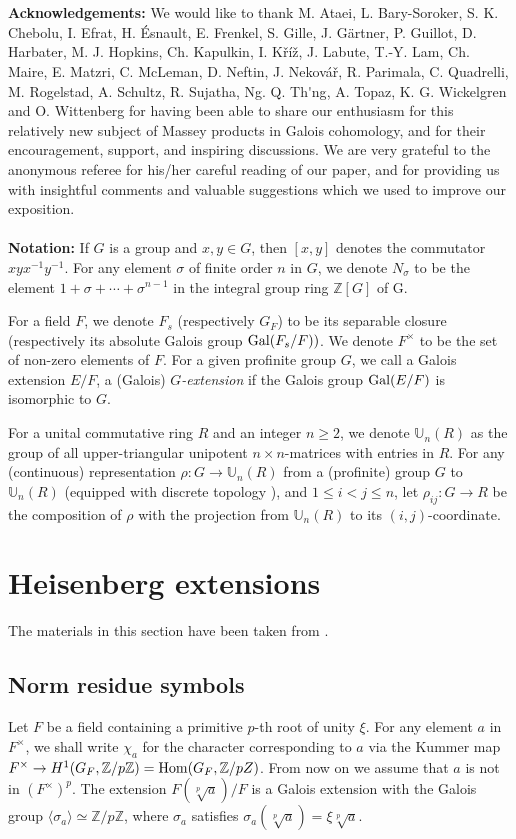 \documentclass[12pt,leqno]{amsart}
\theoremstyle{plain}
\theoremstyle{definition}
\newcommand{\U}{{\mathbb U}}
\newcommand{\Z}{{\mathbb Z}}
\begin{document}
\\
\\
{\bf Acknowledgements: } We would like to thank  M. Ataei, L. Bary-Soroker, S. K. Chebolu, I. Efrat, H. \'{E}snault, E. Frenkel, S. Gille, J. G\"{a}rtner, P. Guillot, D. Harbater, M. J. Hopkins, Ch. Kapulkin, I. K\v{r}\'i\v{z}, J. Labute, T.-Y. Lam, Ch. Maire, E. Matzri,   C. McLeman, D. Neftin, J. Nekov\'a\v{r}, R. Parimala, C. Quadrelli, M. Rogelstad, A. Schultz, R. Sujatha, Ng. Q. {\selectfont Th\'\abreve{}ng}, A. Topaz, K. G. Wickelgren and O. Wittenberg
for having been able to share our enthusiasm for this relatively new subject of Massey products in Galois cohomology, and for their encouragement, support, and  inspiring discussions.   We are  very grateful to the  anonymous referee for his/her  careful reading of our paper, and for providing us with insightful comments and valuable suggestions which we used to improve our exposition.
\\
\\
{\bf Notation:} If $G$ is a group and $x,y\in G$, then $[x,y]$ denotes the commutator $xy x^{-1}y^{-1}$. 
For any element $\sigma$ of  finite order $n$ in $G$, we denote $N_{\sigma}$ to be  the element $1 +\sigma +\cdots +\sigma^{n-1}$ in the integral group ring $\Z[G]$ of G.

For a field $F$, we denote $F_s$ (respectively $G_F$) to be its separable closure (respectively its absolute Galois group ${\rm Gal}(F_s/F))$. We denote $F^\times$ to be the set of non-zero elements of $F$.
 For a given profinite group $G$, we call a Galois extension $E/F$, a (Galois) {\it $G$-extension} if the Galois group ${\rm Gal}(E/F)$ is isomorphic to $G$.
 
For a unital commutative ring $R$ and  an integer $n\geq 2$, we denote $\U_n(R)$ as the group of all upper-triangular unipotent $n\times n$-matrices with entries in $R$.  
For any (continuous) representation $\rho\colon G \to \U_n(R)$ from a (profinite) group $G$ to $\U_n(R)$ (equipped with discrete topology ), and $1\leq i< j\leq n$, let $\rho_{ij}\colon G \to R$ be the composition of $\rho$  with the projection from $\U_n(R)$ to its $(i,j)$-coordinate.

\section{Heisenberg extensions}
\label{sec:Heisenberg}
The materials in this section have been taken from \cite[Section 3]{MT5}.
\subsection{Norm residue symbols}
\label{subsec:norm residue}
Let $F$ be a field containing a primitive $p$-th root of unity $\xi$. 
For any element $a$ in $F^\times$, we shall write $\chi_a$  for the  character corresponding to $a$ via the Kummer map $F^\times\to H^1(G_F,\Z/p\Z)={\rm Hom}(G_F,\Z/pZ)$.  From now on we assume that $a$ is not in $(F^\times)^p$. The extension $F(\sqrt[p]{a})/F$ is a Galois extension with the Galois group $\langle \sigma_a\rangle\simeq \Z/p\Z$, where $\sigma_a$ satisfies $\sigma_a(\sqrt[p]{a})=\xi\sqrt[p]{a}$. 
\end{document}
